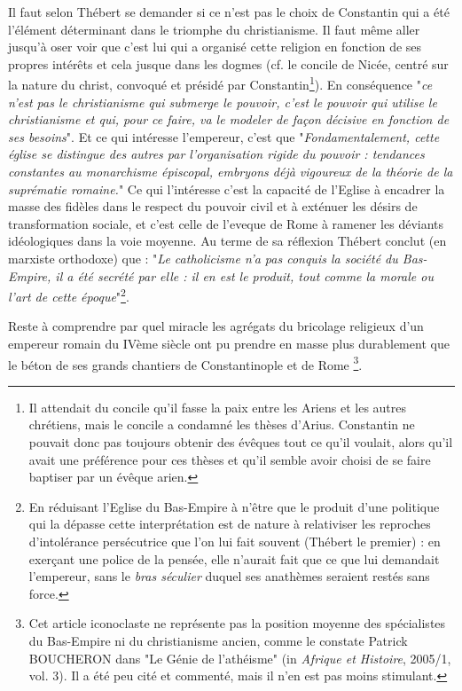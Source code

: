 Il faut selon Thébert se demander si ce n'est pas le choix de Constantin qui a été l'élément déterminant dans le triomphe du christianisme. Il faut même aller jusqu'à oser voir que c'est lui qui a organisé cette religion en fonction de ses propres intérêts et cela jusque dans les dogmes (cf. le concile de Nicée, centré sur la nature du christ, convoqué et présidé par Constantin\footnote{Il attendait du concile qu'il fasse la paix entre les Ariens et les autres chrétiens, mais le concile a condamné les thèses d'Arius. Constantin ne pouvait donc pas toujours obtenir des évêques tout ce qu'il voulait, alors qu'il avait une préférence pour ces thèses et qu'il semble avoir choisi de se faire baptiser par un évêque arien.}). En conséquence "\emph{ce n'est pas le christianisme qui submerge le pouvoir, c'est le pouvoir qui utilise le christianisme et qui, pour ce faire, va le modeler de façon décisive en fonction de ses besoins}". Et ce qui intéresse l'empereur, c'est que "\emph{Fondamentalement, cette église se distingue des autres par l'organisation rigide du pouvoir : tendances constantes au monarchisme épiscopal, embryons déjà vigoureux de la théorie de la suprématie romaine.}" Ce qui l'intéresse c'est la capacité de l'Eglise à encadrer la masse des fidèles dans le respect du pouvoir civil et à exténuer les désirs de transformation sociale, et c'est celle de l'eveque de Rome à ramener les déviants idéologiques dans la voie moyenne. Au terme de sa réflexion Thébert conclut (en marxiste orthodoxe) que : "\emph{Le catholicisme n'a pas conquis la société du Bas-Empire, il a été secrété par elle : il en est le produit, tout comme la morale ou l'art de cette époque}"\footnote{En réduisant l'Eglise du Bas-Empire à n'être que le produit d'une politique qui la dépasse cette interprétation est de nature à relativiser les reproches d'intolérance persécutrice que l'on lui fait souvent (Thébert le premier) : en exerçant une police de la pensée, elle n'aurait fait que ce que lui demandait l'empereur, sans le \emph{bras séculier} duquel ses anathèmes seraient restés sans force.}. 

Reste à comprendre par quel miracle les agrégats du bricolage religieux d'un empereur romain du IVème siècle ont pu prendre en masse plus durablement que le béton de ses grands chantiers de Constantinople et de Rome \footnote{Cet article iconoclaste ne représente pas la position moyenne des spécialistes du Bas-Empire ni du christianisme ancien, comme le constate Patrick BOUCHERON  dans "Le Génie de l'athéisme" (in \emph{Afrique et Histoire}, 2005/1, vol. 3). Il a été peu cité et commenté, mais il n'en est pas moins stimulant.}.


